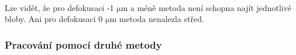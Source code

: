 \documentclass[11pt]{article}
\begin{document}
    \begin{center}
    \end{center}
    { \hspace*{\fill} \\}
    
    Lze vidět, že pro defokusaci -1 \(\mathrm{\mu m}\) a méně metoda není
schopna najít jednotlivé bloby. Ani pro defokusaci 0 \(\mathrm{\mu m}\)
metoda nenalezla střed.

\hypertarget{pracovuxe1nuxed-pomocuxed-druhuxe9-metody}{%
\subsubsection{Pracování pomocí druhé
metody}\label{pracovuxe1nuxed-pomocuxed-druhuxe9-metody}}
\end{document}

